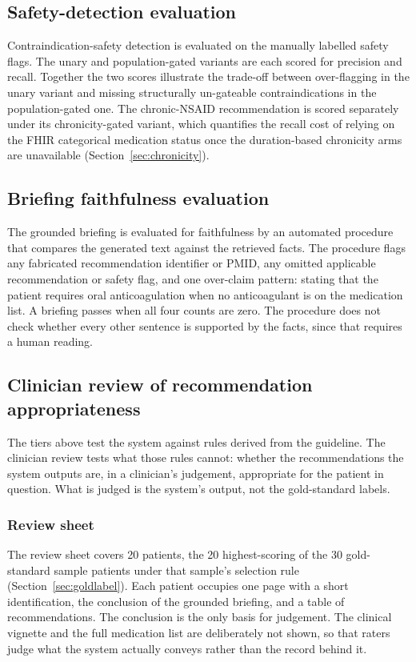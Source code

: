 \subsection{Safety-detection evaluation}
Contraindication-safety detection is evaluated on the manually labelled safety flags. The
unary and population-gated variants are each scored for precision and recall. Together the
two scores illustrate the trade-off between over-flagging in the unary variant and missing
structurally un-gateable contraindications in the population-gated one. The chronic-NSAID recommendation is scored separately
under its chronicity-gated variant, which quantifies the recall cost of relying on the FHIR
categorical medication status once the duration-based chronicity arms are unavailable
(Section~\ref{sec:chronicity}).

\subsection{Briefing faithfulness evaluation}
The grounded briefing is evaluated for faithfulness by an automated procedure that compares
the generated text against the retrieved facts. The procedure flags any fabricated
recommendation identifier or PMID, any omitted applicable recommendation or safety flag, and
one over-claim pattern: stating that the patient requires oral anticoagulation when no
anticoagulant is on the medication list. A briefing passes when all four counts are zero. The
procedure does not check whether every other sentence is supported by the facts, since that
requires a human reading.

\subsection{Clinician review of recommendation appropriateness}
\label{sec:clinician-method}
The tiers above test the system against rules derived from the guideline. The clinician
review tests what those rules cannot: whether the recommendations the system outputs are,
in a clinician's judgement, appropriate for the patient in question. What is judged is the
system's output, not the gold-standard labels.

\subsubsection*{Review sheet}
The review sheet covers 20 patients, the 20 highest-scoring of the 30 gold-standard sample
patients under that sample's selection rule (Section~\ref{sec:goldlabel}). Each patient
occupies one page with a short identification, the conclusion of the grounded briefing, and
a table of recommendations. The conclusion is the only basis for judgement. The clinical
vignette and the full medication list are deliberately not shown, so that raters judge what
the system actually conveys rather than the record behind it.

